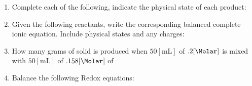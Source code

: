 \documentclass[12pt]{article}
\begin{document}
\begin{enumerate}
  \item Complete each of the following, indicate the physical state of each product:

  \item Given the following reactants, write the corresponding balanced complete ionic equation. Include physical states and any charges:

  \item How many grams of solid is produced when $50[\si{\milli\liter}]$ of $.2[\si{\Molar}]$  is mixed with $50[\si{\milli\liter}]$ of $.158[\si{\Molar}]$ of 

  \item Balance the following Redox equations:

\end{enumerate}
\end{document}
